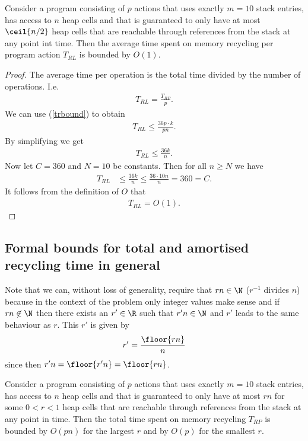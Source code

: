 \documentclass{article}
\begin{document}
\begin{claim}
	Consider a program consisting of $p$ actions that uses exactly $m=10$
	stack entries, has access to $n$ heap cells and that is guaranteed to only
	have at most $\ceil{n/2}$ heap cells that are reachable through references
	from the stack at any point int time.
	Then the average time spent on memory recycling per program
	action $T_{RL}$ is bounded by $O(1)$.
\end{claim}
\begin{proof}
	The average time per operation is the total time divided by the number
	of operations.
	I.e.
	\begin{align*}
		T_{RL} = \frac{T_{RP}}{p}.
	\end{align*}
	We can use (\ref{trbound}) to obtain
	\begin{align*}
		T_{RL} \leq \frac{36p\cdot k}{pn}.
	\end{align*}
	By simplifying we get
	\begin{align*}
		T_{RL} \leq \frac{36k}{n}.
	\end{align*}
	Now let $C=360$ and $N=10$ be constants. Then for all $n\geq N$
	we have
	\begin{align*}
		T_{RL} & \leq \frac{36k}{n} \leq \frac{36\cdot10n}{n} = 360 = C.
	\end{align*}
	It follows from the definition of $O$ that
	\begin{align*}
		T_{RL} = O(1).
	\end{align*}
\end{proof}

\subsection{Formal bounds for total and amortised recycling time in general}

Note that we can, without loss of generality, require that $rn\in\N$ ($r^{-1}$ divides $n$)
because in the context of the problem only integer values make sense and if
$rn\not\in\N$ then there exists an $r'\in\R$ such that $r'n\in\N$ and $r'$ leads
to the same behaviour as $r$. This $r'$ is given by
\begin{align*}
	r'=\frac{\floor{rn}}{n}
\end{align*}
since then $r'n=\floor{r'n}=\floor{rn}$.

\begin{claim}
	Consider a program consisting of $p$ actions that uses exactly $m=10$
	stack entries, has access to $n$ heap cells and that is guaranteed to only
	have at most $rn$ for some $0<r<1$ heap cells that are reachable through references
	from the stack at any point in time.
	Then the total time spent on memory recycling $T_{RP}$ is bounded by $O(pn)$ for
	the largest $r$ and by $O(p)$ for the smallest $r$.
\end{claim}
\end{document}
